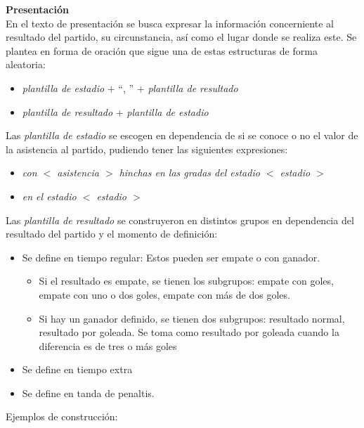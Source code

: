     \textbf{Presentación}\\

    En el texto de presentación se busca expresar la información concerniente al resultado del partido, su circunstancia, así como el lugar donde se 
realiza este. Se plantea en forma de oración que sigue una de estas estructuras de forma aleatoria:
    \begin{itemize}
        \item \textit{plantilla de estadio} $+$ “, ” $+$ \textit{plantilla de resultado}
        \item \textit{plantilla de resultado} + \textit{plantilla de estadio}
    \end{itemize}
        
Las \textit{plantilla de estadio} se escogen en dependencia de si se conoce o no el valor de la asistencia al partido, pudiendo tener las siguientes expresiones:
    \begin{itemize}
        \item \textit{con  $<$ asistencia $>$ hinchas en las gradas del estadio $<$ estadio $>$}
        \item \textit{en el estadio $<$ estadio $>$}
    \end{itemize}

Las \textit{plantilla de resultado} se construyeron en distintos grupos en dependencia del resultado del partido y el momento de definición:
    \begin{itemize}
        \item Se define en tiempo regular: Estos pueden ser empate o con ganador. 
                    \begin{itemize}
                        \item Si el resultado es empate, se tienen los subgrupos: empate con goles, 
                        empate con uno o dos goles, empate con más de dos goles. 
                        \item  Si hay un ganador definido, se tienen dos subgrupos: resultado normal, 
                        resultado por goleada. Se toma como resultado por goleada cuando la diferencia es de tres o más goles
                    \end{itemize}
        \item Se define en tiempo extra
        \item Se define en tanda de penaltis.
    \end{itemize}

    Ejemplos de construcción:\\

